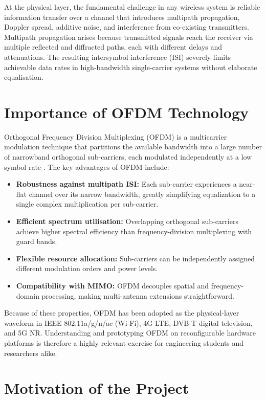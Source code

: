 \documentclass[12pt, a4paper, oneside]{report}
\begin{document}
At the physical layer, the fundamental challenge in any wireless system is reliable information transfer over a channel that introduces multipath propagation, Doppler spread, additive noise, and interference from co-existing transmitters. Multipath propagation arises because transmitted signals reach the receiver via multiple reflected and diffracted paths, each with different delays and attenuations. The resulting intersymbol interference (ISI) severely limits achievable data rates in high-bandwidth single-carrier systems without elaborate equalisation.

\section{Importance of OFDM Technology}

Orthogonal Frequency Division Multiplexing (OFDM) is a multicarrier modulation technique that partitions the available bandwidth into a large number of narrowband orthogonal sub-carriers, each modulated independently at a low symbol rate \cite{proakis2008digital}. The key advantages of OFDM include:

\begin{itemize}[noitemsep]
  \item \textbf{Robustness against multipath ISI:} Each sub-carrier experiences a near-flat channel over its narrow bandwidth, greatly simplifying equalization to a single complex multiplication per sub-carrier.
  \item \textbf{Efficient spectrum utilisation:} Overlapping orthogonal sub-carriers achieve higher spectral efficiency than frequency-division multiplexing with guard bands.
  \item \textbf{Flexible resource allocation:} Sub-carriers can be independently assigned different modulation orders and power levels.
  \item \textbf{Compatibility with MIMO:} OFDM decouples spatial and frequency-domain processing, making multi-antenna extensions straightforward.
\end{itemize}

Because of these properties, OFDM has been adopted as the physical-layer waveform in IEEE 802.11a/g/n/ac (Wi-Fi), 4G LTE, DVB-T digital television, and 5G NR. Understanding and prototyping OFDM on reconfigurable hardware platforms is therefore a highly relevant exercise for engineering students and researchers alike.

\section{Motivation of the Project}
\end{document}
